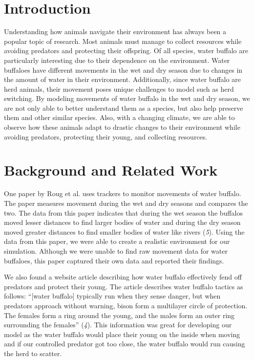 \documentclass[12pt]{article}
\begin{document}
\section*{Introduction}

Understanding how animals navigate their environment has always been a popular topic of research. Most animals must manage to collect resources while avoiding predators and protecting their offspring. Of all species, water buffalo are particularly interesting due to their dependence on the environment. Water buffaloes have different movements in the wet and dry season due to changes in the amount of water in their environment. Additionally, since water buffalo are herd animals, their movement poses unique challenges to model such as herd switching. By modeling movements of water buffalo in the wet and dry season, we are not only able to better understand them as a species, but also help preserve them and other similar species. Also, with a changing climate, we are able to observe how these animals adapt to drastic changes to their environment while avoiding predators, protecting their young, and collecting resources.

\section*{Background and Related Work}

One paper by Roug et al. uses trackers to monitor movements of water buffalo. The paper measures movement during the wet and dry seasons and compares the two. The data from this paper indicates that during the wet season the buffalos moved lesser distances to find larger bodies of water and during the dry season moved greater distances to find smaller bodies of water like rivers ({\it 5}). Using the data from this paper, we were able to create a realistic environment for our simulation. Although we were unable to find raw movement data for water buffaloes, this paper captured their own data and reported their findings. 

We also found a website article describing how water buffalo effectively fend off predators and protect their young. The article describes water buffalo tactics as follows: “[water buffalo] typically run when they sense danger, but when predators approach without warning, bison form a multilayer circle of protection. The females form a ring around the young, and the males form an outer ring surrounding the females” ({\it 4}). This information was great for developing our model as the water buffalo would place their young on the inside when moving and if our controlled predator got too close, the water buffalo would run causing the herd to scatter.
\end{document}
